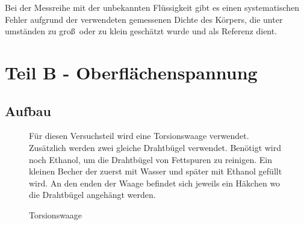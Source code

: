 \documentclass[11pt,a4paper]{article}
\begin{document}
Bei der Messreihe mit der unbekannten Fl\"ussigkeit gibt es einen systematischen Fehler aufgrund der verwendeten gemessenen Dichte des K\"orpers, die unter umst\"anden zu gro\ss\ oder zu klein gesch\"atzt wurde und als Referenz dient.
\pagebreak

\section{Teil B - Oberfl\"achenspannung}

\subsection{Aufbau}

\begin{figure}[h]
\begin{minipage}{.6\textwidth}
Für diesen Versuchsteil wird eine Torsionswaage verwendet. Zusätzlich werden zwei gleiche Drahtbügel verwendet. Benötigt wird noch Ethanol, um die Drahtbügel von Fettspuren zu reinigen. Ein kleinen Becher der zuerst mit Wasser und später mit Ethanol gefüllt wird. An den enden der Waage befindet sich jeweils ein Häkchen wo die Drahtbügel angehängt werden. 
\end{minipage}%
\begin{minipage}{.4\textwidth}
\centering
{}
   \renewcommand\thefigure{B2}
\caption[Torsionswaage]{Torsionswaage \cite{Anleitung}}
\label{NS1}
\end{minipage}
\end{figure}
\end{document}
